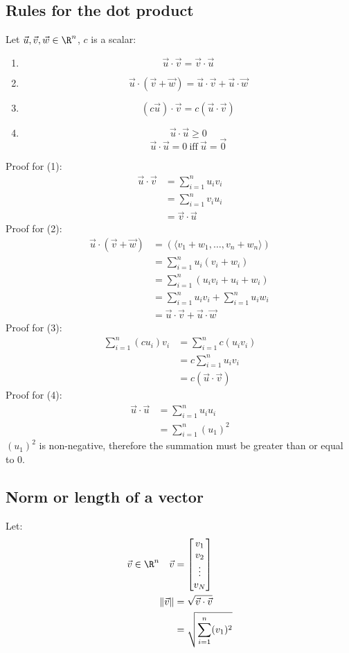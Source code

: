 \documentclass[letterpaper, 12pt]{math}
\begin{document}
\subsection*{Rules for the dot product}
Let \( \vec{u},\vec{v},\vec{w}\in\R^n \), \( c \) is a scalar:
\begin{enumerate}
  \item
    \[ \vec{u}\cdot\vec{v} = \vec{v}\cdot\vec{u} \]
  \item
    \[ \vec{u}\cdot(\vec{v}+\vec{w}) =
      \vec{u}\cdot\vec{v}+\vec{u}\cdot\vec{w} \]
  \item
    \[ (c\vec{u})\cdot\vec{v} = c(\vec{u}\cdot\vec{v}) \]
  \item
    \[ \vec{u}\cdot\vec{u}\geq0 \]
    \[ \vec{u}\cdot\vec{u} = 0\ \textrm{iff}\ \vec{u} = \vec{0} \]
\end{enumerate}
Proof for (1):
\begin{align*}
  \vec{u}\cdot\vec{v} &= \sum_{i=1}^{n}u_{i}v_{i} \\
  &= \sum_{i=1}^{n}v_{i}u_{i} \\
  &= \vec{v}\cdot\vec{u}
\end{align*}
Proof for (2):
\begin{align*}
  \vec{u}\cdot(\vec{v}+\vec{w}) &=
    (\langle v_{1}+w_{1},\dots,v_{n}+w_{n}\rangle) \\
  &= \sum_{i=1}^{n}u_{i}(v_{i}+w_{i}) \\
  &= \sum_{i=1}^{n}(u_{i}v_{i}+u_{i}+w_{i}) \\
  &= \sum_{i=1}^{n}u_{i}v_{i}+\sum_{i=1}^{n}u_{i}w_{i} \\
  &= \vec{u}\cdot\vec{v}+\vec{u}\cdot\vec{w}
\end{align*}
Proof for (3):
\begin{align*}
  \sum_{i=1}^{n}(cu_{i})v_{i} &= \sum_{i=1}^{n}c(u_{i}v_{i}) \\
  &= c\sum_{i=1}^{n}u_{i}v_{i} \\
  &= c(\vec{u}\cdot\vec{v})
\end{align*}
Proof for (4):
\begin{align*}
  \vec{u}\cdot\vec{u} &= \sum_{i=1}^{n}u_{i}u_{i} \\
  &= \sum_{i=1}^{n}(u_{1})^{2}
\end{align*}
\( (u_{1})^{2} \) is non-negative, therefore the summation must be greater than
or equal to 0.

\subsection*{Norm or length of a vector}
Let:
\begin{align*}
  \vec{v}\in\R^n \quad \vec{v} &= \begin{bmatrix}
    v_{1} \\ v_{2} \\ \vdots \\ v_{N}
  \end{bmatrix} \\
  \|\vec{v}\| &= \sqrt{\vec{v}\cdot\vec{v}} \\
  &= \sqrt{\sum_{i=1}^{n}(v_{1})^{2}}
\end{align*}
\end{document}
